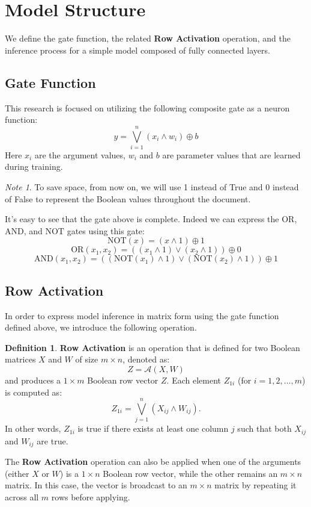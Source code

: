 \documentclass{article}
\theoremstyle{definition}
\newtheorem*{definition}{Definition}
\theoremstyle{remark}
\newtheorem*{note}{Note}
\begin{document}
\section{Model Structure}
We define the gate function, the related \textbf{Row Activation} operation, and the inference process for a simple model composed of fully connected layers.

\subsection{Gate Function}
This research is focused on utilizing the following composite gate as a neuron function:
\[ y = \bigvee_{i=1}^{n} \left( x_{i} \wedge w_{i} \right) \oplus b \]
Here \( x_{i} \) are the argument values, \( w_{i} \) and \( b \) are parameter values that are learned during training.

\begin{note}
    To save space, from now on, we will use 1 instead of True and 0 instead of False to represent the Boolean values throughout the document.
\end{note}

It's easy to see that the gate above is complete. Indeed we can express the OR, AND, and NOT gates using this gate:
\[ \text{NOT}(x) = \left( x \wedge 1 \right) \oplus 1 \]
\[ \text{OR}(x_1, x_2) = \left( \left( x_1 \wedge 1 \right) \vee \left( x_2 \wedge 1 \right) \right) \oplus 0 \]
\[ \text{AND}(x_1, x_2) = \left( \left( \text{NOT}(x_1) \wedge 1 \right) \vee \left( \text{NOT}(x_2) \wedge 1 \right) \right) \oplus 1 \]

\subsection{Row Activation}
In order to express model inference in matrix form using the gate function defined above, we introduce the following operation.

\begin{definition}
    \textbf{Row Activation} is an operation that is defined for two Boolean matrices \( X \) and \( W \) of size \( m \times n \), denoted as:
    \[ Z = \mathcal{A}(X, W) \]
    and produces a \( 1 \times m \) Boolean row vector \( Z \). Each element \( Z_{1i} \) (for \( i = 1, 2, \dots, m \)) is computed as:
    \[ Z_{1i} = \bigvee_{j=1}^{n} \left( X_{ij} \wedge W_{ij} \right). \]
    In other words, \( Z_{1i} \) is true if there exists at least one column \( j \) such that both \( X_{ij} \) and \( W_{ij} \) are true.

    The \textbf{Row Activation} operation can also be applied when one of the arguments (either \( X \) or \( W \)) is a \( 1 \times n \) Boolean row vector, while the other remains an \( m \times n \) matrix. In this case, the vector is broadcast to an \( m \times n \) matrix by repeating it across all \( m \) rows before applying.
\end{definition}
\end{document}
